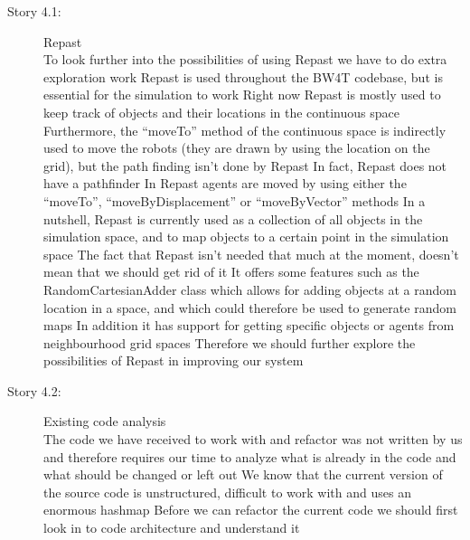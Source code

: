 \begin{description}
\item[Story 4.1:] Repast\\
To look further into the possibilities of using Repast we have to do extra exploration work
Repast is used throughout the BW4T codebase, but is essential for the simulation to work
Right now Repast is mostly used to keep track of objects and their locations in the continuous space
Furthermore, the “moveTo” method of the continuous space is indirectly used to move the robots (they are drawn by using the location on the grid), but the path ﬁnding isn’t done by Repast
In fact, Repast does not have a pathﬁnder
In Repast agents are moved by using either the “moveTo”, “moveByDisplacement” or “moveByVector” methods
In a nutshell, Repast is currently used as a collection of all objects in the simulation space, and to map objects to a certain point in the simulation space
The fact that Repast isn’t needed that much at the moment, doesn’t mean that we should get rid of it
It oﬀers some features such as the RandomCartesianAdder class which allows for adding objects at a random location in a space, and which could therefore be used to generate random maps
In addition it has support for getting speciﬁc objects or agents from neighbourhood grid spaces
Therefore we should further explore the possibilities of Repast in improving our system
\end{description}

\begin{description}
\item[Story 4.2:] Existing code analysis\\
The code we have received to work with and refactor was not written by us and therefore requires our time to analyze what is already in the code and what should be changed or left out
We know that the current version of the source code is unstructured, difficult to work with and uses an enormous hashmap
Before we can refactor the current code we should first look in to code architecture and understand it
\end{description}